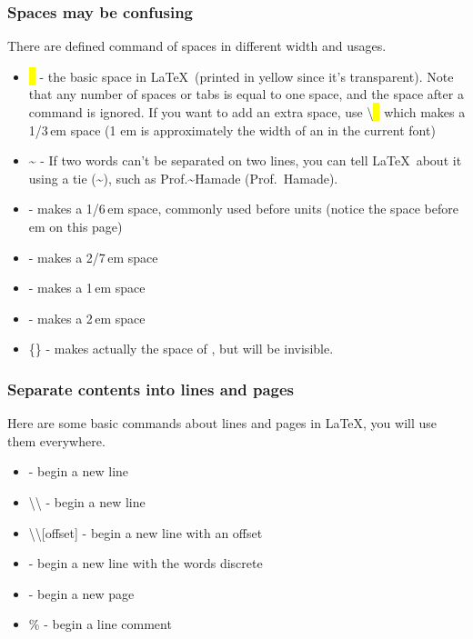 \begin{frame}
	\frametitle{Spaces may be confusing}
	There are defined command of spaces in different width and usages.
	\begin{itemize}
		\item \colorbox{yellow}{\ } - the basic space in \LaTeX\ (printed in yellow since it's transparent). Note that any number of spaces or tabs is equal to one space, and the space after a command is ignored. If you want to add an extra space, use \alert{\textbackslash}\colorbox{yellow}{\ } which makes a 1/3\,em space (1 em is approximately the width of an  in the current font)
		\item \~{} - If two words can't be separated on two lines, you can tell \LaTeX\ about it using a tie (\~{}), such as Prof.\~{}Hamade (Prof.~Hamade).
		\item  \samplecommand{,} - makes a 1/6\,em space, commonly used before units (notice the space before em on this page)
		\item  \samplecommand{;} - makes a 2/7\,em space
		\item  {} - makes a 1\,em space
		\item  {} - makes a 2\,em space
		\item  {}\{\} - makes actually the space of , but  will be invisible.
	\end{itemize}
\end{frame}

\begin{frame}
	\frametitle{Separate contents into lines and pages}
	Here are some basic commands about lines and pages in \LaTeX, you will use them everywhere.
	\begin{itemize}
		\item {} - begin a new line
		\item \alert{\textbackslash\textbackslash} - begin a new line
		\item \alert{\textbackslash\textbackslash[offset]} - begin a new line with an offset
		\item {} - begin a new line with the words discrete
		\item {} - begin a new page
		\item \alert{\%} - begin a line comment
	\end{itemize}
\end{frame}


